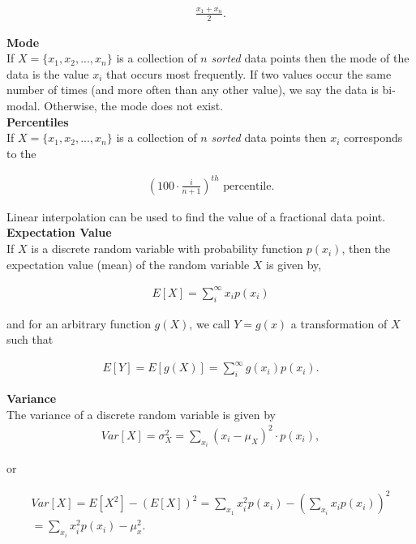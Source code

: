 \documentclass{article}
\numberwithin{theorem}{subsection}
\numberwithin{theorem}{subsubsection}
\numberwithin{lemma}{subsection}
\numberwithin{lemma}{subsubsection}
\theoremstyle{definition}
\numberwithin{definition}{subsection}
\numberwithin{definition}{subsubsection}
\begin{document}
\begin{gather*}
    \frac{x_{1} + x_{n}}{2}.
\end{gather*}

\noindent \textbf{Mode} \\
\indent If $X = \{x_{1},x_{2},...,x_{n}\}$ is a collection of $n$ \textit{sorted} data points then the mode of the data is the value $x_{i}$ that occurs most frequently. If two values occur the same number of times (and more often than any other value), we say the data is bi-modal. Otherwise, the mode does not exist.
\\

\noindent \textbf{Percentiles} \\
\indent If $X = \{x_{1},x_{2},...,x_{n}\}$ is a collection of $n$ \textit{sorted} data points then $x_{i}$ corresponds to the

\begin{gather*}
    \left ( 100 \cdot \frac{i}{n+1}\right )^{th} \text{ percentile}.
\end{gather*}

\indent Linear interpolation can be used to find the value of a fractional data point.\\

\noindent \textbf{Expectation Value} \\
\indent If $X$ is a discrete random variable with probability function $p(x_{i})$, then the expectation value (mean) of the random variable $X$ is given by,

\begin{gather*}
    E[X] = \sum_{i}^{\infty} x_{i}p(x_{i})
\end{gather*}

\noindent and for an arbitrary function $g(X)$, we call $Y = g(x)$ a transformation of $X$ such that

\begin{gather*}
    E[Y] = E[g(X)] = \sum_{i}^{\infty} g(x_{i})p(x_{i}).
\end{gather*}

\noindent \textbf{Variance} \\
The variance of a discrete random variable is given by
\begin{gather*}
    Var[X] = \sigma_{X}^{2} = \sum_{x_{i}} (x_{i} - \mu_{X})^{2} \cdot p(x_{i}),
\end{gather*}

or

\begin{gather*}
    Var[X] = E[X^2] - (E[X])^{2} = \sum_{x_{1}} x_{i}^{2} p(x_{i}) - \left ( \sum_{x_{i}} x_{i} p(x_{i})\right )^{2} \\
    = \sum_{x_{i}} x_{i}^{2} p(x_{i}) - \mu_{x}^{2}.
\end{gather*}
\end{document}
